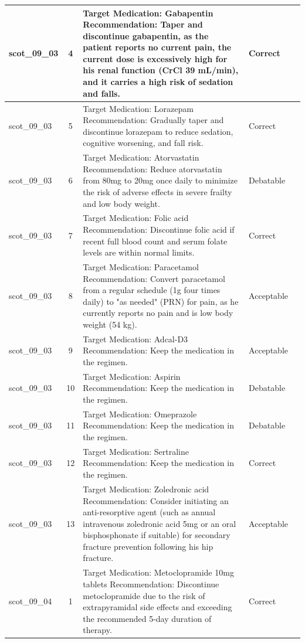 \begin{longtable}{|p{1.45cm}|c|p{10.2cm}|p{1.55cm}|p{2.3cm}|}
\hline
scot\_09\_03 & 4 & Target Medication: Gabapentin Recommendation: Taper and discontinue gabapentin, as the patient reports no current pain, the current dose is excessively high for his renal function (CrCl 39 mL/min), and it carries a high risk of sedation and falls. & Correct &  \\
\hline
scot\_09\_03 & 5 & Target Medication: Lorazepam Recommendation: Gradually taper and discontinue lorazepam to reduce sedation, cognitive worsening, and fall risk. & Correct &  \\
\hline
scot\_09\_03 & 6 & Target Medication: Atorvastatin Recommendation: Reduce atorvastatin from 80mg to 20mg once daily to minimize the risk of adverse effects in severe frailty and low body weight. & Debatable &  \\
\hline
scot\_09\_03 & 7 & Target Medication: Folic acid Recommendation: Discontinue folic acid if recent full blood count and serum folate levels are within normal limits. & Correct &  \\
\hline
scot\_09\_03 & 8 & Target Medication: Paracetamol Recommendation: Convert paracetamol from a regular schedule (1g four times daily) to "as needed" (PRN) for pain, as he currently reports no pain and is low body weight (54 kg). & Acceptable &  \\
\hline
scot\_09\_03 & 9 & Target Medication: Adcal-D3 Recommendation: Keep the medication in the regimen. & Acceptable &  \\
\hline
scot\_09\_03 & 10 & Target Medication: Aspirin Recommendation: Keep the medication in the regimen. & Debatable &  \\
\hline
scot\_09\_03 & 11 & Target Medication: Omeprazole Recommendation: Keep the medication in the regimen. & Debatable &  \\
\hline
scot\_09\_03 & 12 & Target Medication: Sertraline Recommendation: Keep the medication in the regimen. & Correct &  \\
\hline
scot\_09\_03 & 13 & Target Medication: Zoledronic acid Recommendation: Consider initiating an anti-resorptive agent (such as annual intravenous zoledronic acid 5mg or an oral bisphosphonate if suitable) for secondary fracture prevention following his hip fracture. & Acceptable &  \\
\hline
scot\_09\_04 & 1 & Target Medication: Metoclopramide 10mg tablets Recommendation: Discontinue metoclopramide due to the risk of extrapyramidal side effects and exceeding the recommended 5-day duration of therapy. & Correct &  \\

\end{longtable}
